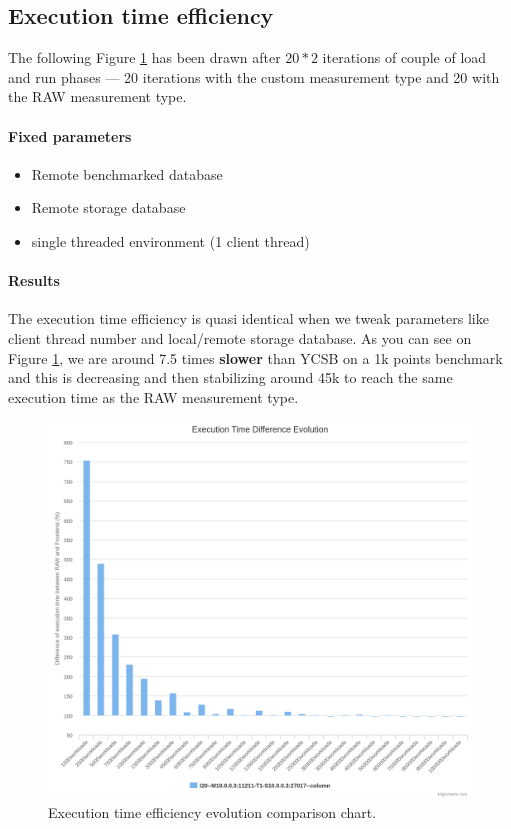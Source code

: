 \documentclass[a4paper,11pt]{report}
\begin{document}
\clearpage

\subsection{Execution time efficiency}

The following Figure \ref{execution_time} has been drawn after $20*2$ iterations of couple of load and run phases --- 20 iterations with the custom measurement type and 20 with the RAW measurement type.

\paragraph{Fixed parameters}
\begin{itemize}
\item
Remote benchmarked database
\item
Remote storage database
\item
single threaded environment (1 client thread)
\end{itemize}

\paragraph{Results}

The execution time efficiency is quasi identical when we tweak parameters like client thread number and local/remote storage database. As you can see on Figure \ref{execution_time}, we are around 7.5 times \textbf{slower} than YCSB on a 1k points benchmark and this is decreasing and then stabilizing around 45k to reach the same execution time as the RAW measurement type.

\begin{figure}[ht]
\begin{center}
\includegraphics[width=1\linewidth]{images/evaluation/execution_time.png}
\caption{Execution time efficiency evolution comparison chart.}
\label{execution_time}
\end{center}
\end{figure}
\end{document}

